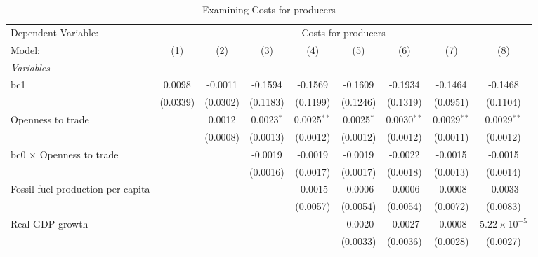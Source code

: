 
\begin{table}[htbp]
   \caption{Examining Costs for producers}
   \centering
   \begin{tabular}{lcccccccc}
      \tabularnewline \midrule \midrule
      Dependent Variable: & \multicolumn{8}{c}{Costs for producers}\\
      Model:                                  & (1)      & (2)      & (3)          & (4)           & (5)          & (6)           & (7)           & (8)\\  
      \midrule
      \emph{Variables}\\
      bc1                                     & 0.0098   & -0.0011  & -0.1594      & -0.1569       & -0.1609      & -0.1934       & -0.1464       & -0.1468\\   
                                              & (0.0339) & (0.0302) & (0.1183)     & (0.1199)      & (0.1246)     & (0.1319)      & (0.0951)      & (0.1104)\\   
      Openness to trade                       &          & 0.0012   & 0.0023$^{*}$ & 0.0025$^{**}$ & 0.0025$^{*}$ & 0.0030$^{**}$ & 0.0029$^{**}$ & 0.0029$^{**}$\\   
                                              &          & (0.0008) & (0.0013)     & (0.0012)      & (0.0012)     & (0.0012)      & (0.0011)      & (0.0012)\\   
      bc0 $\times$ Openness to trade          &          &          & -0.0019      & -0.0019       & -0.0019      & -0.0022       & -0.0015       & -0.0015\\   
                                              &          &          & (0.0016)     & (0.0017)      & (0.0017)     & (0.0018)      & (0.0013)      & (0.0014)\\   
      Fossil fuel production per capita       &          &          &              & -0.0015       & -0.0006      & -0.0006       & -0.0008       & -0.0033\\   
                                              &          &          &              & (0.0057)      & (0.0054)     & (0.0054)      & (0.0072)      & (0.0083)\\   
      Real GDP growth                         &          &          &              &               & -0.0020      & -0.0027       & -0.0008       & $5.22\times 10^{-5}$\\    
                                              &          &          &              &               & (0.0033)     & (0.0036)      & (0.0028)      & (0.0027)\\   

\end{tabular}
\end{table}
